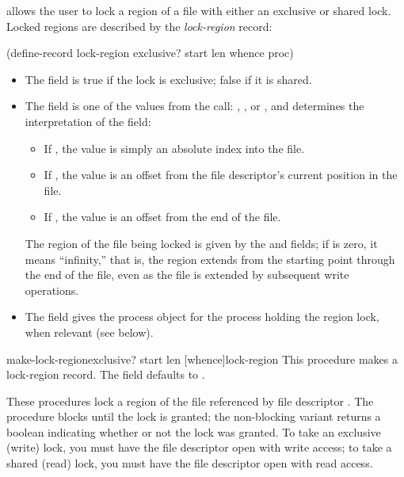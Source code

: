 {\Posix} allows the user to lock a region of a file with either 
an exclusive or shared lock.
Locked regions are described by the \emph{lock-region} record:
\begin{code}
(define-record lock-region
  exclusive?
  start
  len
  whence
  proc)\end{code}%
%
%
\begin{itemize}
\item 
The  field is true if the lock is exclusive; 
false if it is shared.

\item 
The  field is one of the values from the  call:
, , or , 
and determines the interpretation of the  field:
\begin{itemize}
\item If , the  value is simply an absolute index
into the file.
\item If , the  value is an offset from the 
file descriptor's current position in the file.
\item If , the  value is an offset from the 
end of the file.
\end{itemize}
The region of the file being locked is given by the  and 
fields;
if  is zero, it means ``infinity,'' that is, the region extends
from the starting point through the end of the file, even as the file is
extended by subsequent write operations.

\item 
The  field gives the process object for the process holding the region
lock, when relevant (see  below).
\end{itemize}

\begin{defundesc}{make-lock-region}{exclusive? start len [whence]}{lock-region}
This procedure makes a lock-region record. 
The  field defaults to .
\end{defundesc}

\begin{desc}
These procedures lock a region of the file referenced by file descriptor
.
The  procedure blocks until the lock is granted;
the non-blocking variant returns a boolean indicating whether or not
the lock was granted.
To take an exclusive (write) lock, you must have the file descriptor
open with write access;
to take a shared (read) lock, you must have the file descriptor
open with read access.
\end{desc}

